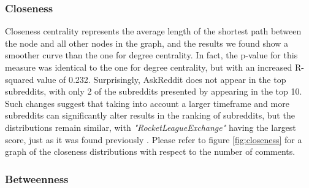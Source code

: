 \documentclass[bsc,frontabs,twoside,singlespacing,parskip,deptreport]{infthesis}
\begin{document}
\subsubsection{Closeness}

Closeness centrality represents the average length of the shortest path between the node and all other nodes in the graph, and the results we found show a smoother curve than the one for degree centrality. In fact, the p-value for this measure was identical to the one for degree centrality, but with an increased R-squared value of 0.232. Surprisingly, AskReddit does not appear in the top subreddits, with only 2 of the subreddits presented by \cite{masters} appearing in the top 10. Such changes suggest that taking into account a larger timeframe and more subreddits can significantly alter results in the ranking of subreddits, but the distributions remain similar, with \textit{"RocketLeagueExchange"} having the largest score, just as it was found previously \cite{masters}. Please refer to figure \ref{fig:closeness} for a graph of the closeness distributions with respect to the number of comments.

\begin{table}[!h]
\centering
{}
\caption{Top 10 subreddits ordered by their closeness score}
\label{top-closeness}
\end{table}

\subsubsection{Betweenness}
\end{document}
